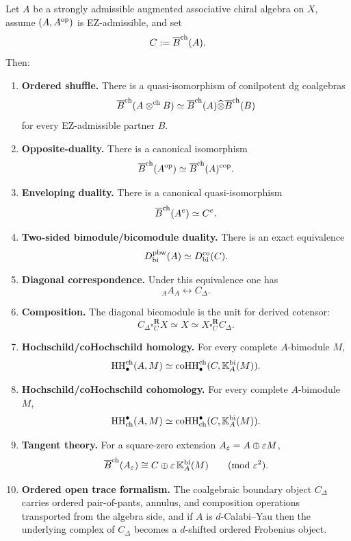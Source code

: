 \begin{theorem}
Let $A$ be a strongly admissible augmented associative chiral algebra on $X$, assume
$(A,A^{\mathrm{op}})$ is EZ-admissible, and set
\[
C:=\overline{B}^{\mathrm{ch}}(A).
\]
Then:
\begin{enumerate}[label=(\arabic*)]
\item \textbf{Ordered shuffle.}
There is a quasi-isomorphism of conilpotent dg coalgebras
\[
\overline{B}^{\mathrm{ch}}(A\mathbin{\otimes^{\mathrm{ch}}} B)\simeq \overline{B}^{\mathrm{ch}}(A)\widehat\otimes \overline{B}^{\mathrm{ch}}(B)
\]
for every EZ-admissible partner $B$.

\item \textbf{Opposite-duality.}
There is a canonical isomorphism
\[
\overline{B}^{\mathrm{ch}}(A^{\mathrm{op}})\simeq \overline{B}^{\mathrm{ch}}(A)^{\mathrm{cop}}.
\]

\item \textbf{Enveloping duality.}
There is a canonical quasi-isomorphism
\[
\overline{B}^{\mathrm{ch}}(A^e)\simeq C^e.
\]

\item \textbf{Two-sided bimodule/bicomodule duality.}
There is an exact equivalence
\[
D^{\mathrm{pbw}}_{\mathrm{bi}}(A)\simeq D^{\mathrm{co}}_{\mathrm{bi}}(C).
\]

\item \textbf{Diagonal correspondence.}
Under this equivalence one has
\[
{}_A A_A \longleftrightarrow C_\Delta.
\]

\item \textbf{Composition.}
The diagonal bicomodule is the unit for derived cotensor:
\[
C_\Delta\square_C^{\mathbf R} X\simeq X\simeq X\square_C^{\mathbf R}C_\Delta.
\]

\item \textbf{Hochschild/coHochschild homology.}
For every complete $A$-bimodule $M$,
\[
\operatorname{HH}^{\mathrm{ch}}_\bullet(A,M)
\simeq
\operatorname{coHH}^{\mathrm{ch}}_\bullet(C,\mathbb{K}_A^{\mathrm{bi}}(M)).
\]

\item \textbf{Hochschild/coHochschild cohomology.}
For every complete $A$-bimodule $M$,
\[
\operatorname{HH}_{\mathrm{ch}}^\bullet(A,M)
\simeq
\operatorname{coHH}_{\mathrm{ch}}^\bullet(C,\mathbb{K}_A^{\mathrm{bi}}(M)).
\]

\item \textbf{Tangent theory.}
For a square-zero extension $A_\varepsilon=A\oplus \varepsilon M$,
\[
\Barch(A_\eps)\cong C\oplus \eps\,\KK_A^{\mathrm{bi}}(M)\qquad (\mathrm{mod}\ \eps^2).
\]

\item \textbf{Ordered open trace formalism.}
The coalgebraic boundary object $C_\Delta$ carries ordered pair-of-pants, annulus, and composition
operations transported from the algebra side, and if $A$ is $d$-Calabi--Yau then the underlying
complex of $C_\Delta$ becomes a $d$-shifted ordered Frobenius object.
\end{enumerate}
\end{theorem}

